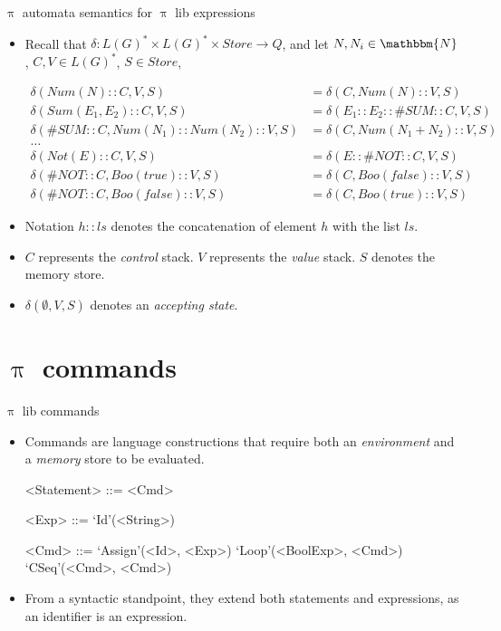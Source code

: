\documentclass{beamer}
\begin{document}

\begin{frame}{{\color{red}$\uppi$ automata} semantics for {\color{red}$\uppi$ lib} expressions}
\begin{itemize}
\item Recall that $\delta : L(G)^* \times L(G)^* \times Store \to Q$, and let $N, N_i \in \mathbbm{N}$, $C, V \in L(G)^*$, $S \in \mathit{Store}$,
\begin{scriptsize}
\begin{align}
\delta(Num(N) :: C, V, S) & = \delta(C, Num(N) :: V, S) \\
\delta(Sum(E_1, E_2) :: C, V, S) & = \delta(E_1 :: E_2 :: \#SUM :: C, V, S) \\
\delta(\#SUM :: C, Num(N_1) :: Num(N_2) :: V, S) & = \delta(C, Num(N_1 + N_2) :: V, S) \\
\ldots \nonumber \\
\delta(Not(E) :: C, V, S) & = \delta(E :: \#NOT :: C, V, S) \\
\delta(\#NOT :: C, Boo(true) :: V, S) & = \delta(C, Boo(false) :: V, S) \\
\delta(\#NOT :: C, Boo(false) :: V, S) & = \delta(C, Boo(true) :: V, S) 
\end{align}
\end{scriptsize}

\item Notation $h :: ls$ denotes the concatenation of element $h$ with the list $ls$. 

\item $C$ represents the \emph{control} stack. $V$ represents the \emph{value} stack. $S$ denotes the memory store.

\item $\delta(\emptyset, V, S)$ denotes an \emph{accepting state}.
\end{itemize}
\end{frame}

\section{$\uppi$ commands}


\begin{frame}{{\color{red} $\uppi$ lib} commands}

\begin{itemize}
\item Commands are language constructions that require both an \emph{environment} and a \emph{memory} store to be evaluated. 
\begin{grammar}
<Statement> ::=  <Cmd> 

<Exp>       ::= `Id'(<String>) 

<Cmd>       ::=  `Assign'(<Id>, <Exp>) \alt `Loop'(<BoolExp>, <Cmd>) \alt  `CSeq'(<Cmd>, <Cmd>)
\end{grammar}


\item From a syntactic standpoint, they extend both statements and expressions, as an identifier is an expression.
\end{itemize}

\end{frame}
\end{document}
